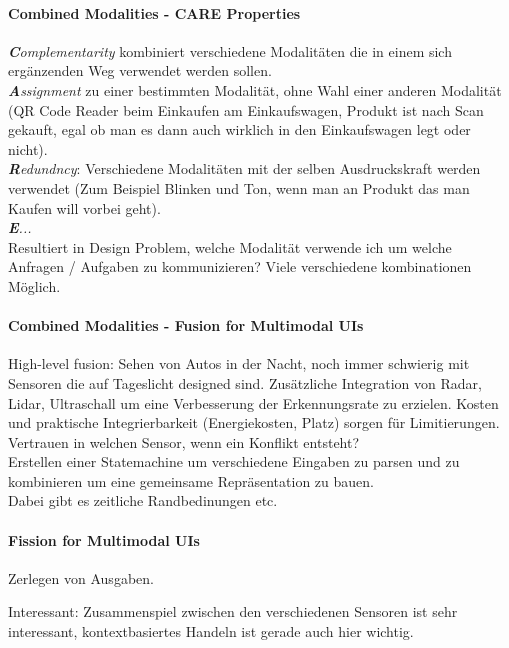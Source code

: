 \paragraph{Combined Modalities - CARE Properties}

\textit{\textbf{C}omplementarity} kombiniert verschiedene Modalitäten die in einem sich ergänzenden Weg
verwendet werden sollen.\\
\textit{\textbf{A}ssignment} zu einer bestimmten Modalität, ohne Wahl einer anderen
Modalität (QR Code Reader beim Einkaufen am Einkaufswagen, Produkt ist nach Scan gekauft,
egal ob man es dann auch wirklich in den Einkaufswagen legt oder nicht).\\
\textit{\textbf{R}edundncy}: Verschiedene Modalitäten mit der selben Ausdruckskraft werden 
verwendet (Zum Beispiel Blinken und Ton, wenn man an Produkt das man Kaufen will vorbei
geht).\\ 
\textit{\textbf{E}...}\\

Resultiert in Design Problem, welche Modalität verwende ich um welche Anfragen / Aufgaben 
zu kommunizieren? Viele verschiedene kombinationen Möglich.

\paragraph{Combined Modalities - Fusion for Multimodal UIs}

High-level fusion: Sehen von Autos in der Nacht, noch immer schwierig mit Sensoren die 
auf Tageslicht designed sind. Zusätzliche Integration von Radar, Lidar, Ultraschall um 
eine Verbesserung der Erkennungsrate zu erzielen. Kosten und praktische Integrierbarkeit
(Energiekosten, Platz) sorgen für Limitierungen.\\
Vertrauen in welchen Sensor, wenn ein Konflikt entsteht? \\
Erstellen einer Statemachine um verschiedene Eingaben zu parsen und zu kombinieren
um eine gemeinsame Repräsentation zu bauen. \\
Dabei gibt es zeitliche Randbedinungen etc.\\

\paragraph{Fission for Multimodal UIs}

Zerlegen von Ausgaben.

Interessant: Zusammenspiel zwischen den verschiedenen Sensoren ist sehr interessant,
kontextbasiertes Handeln ist gerade auch hier wichtig.


